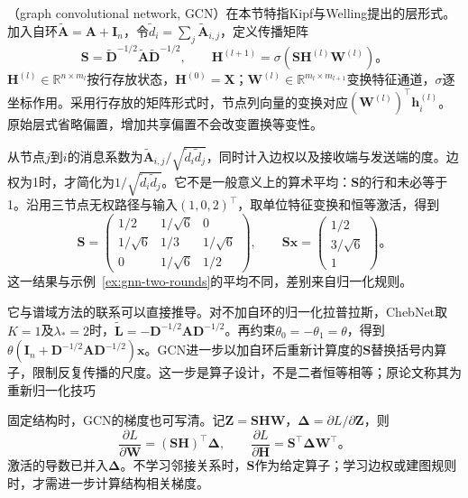 （graph convolutional network, GCN）在本节特指Kipf与Welling提出的层形式。加入自环$\widetilde{\bm{A}}=\bm{A}+\bm{I}_n$，令$\widetilde d_i=\sum_j\widetilde{\bm{A}}_{i,j}$，定义传播矩阵
\begin{equation}
  \bm{S}=\widetilde{\bm{D}}^{-1/2}\widetilde{\bm{A}}\widetilde{\bm{D}}^{-1/2},
  \qquad
  \bm{H}^{(l+1)}=\sigma\!\left(\bm{S}\bm{H}^{(l)}\bm{W}^{(l)}\right)\text{。}
  \label{eq:gnn-gcn-layer}
\end{equation}
$\bm{H}^{(l)}\in\mathbb{R}^{n\times m_l}$按行存放状态，$\bm{H}^{(0)}=\bm{X}$；$\bm{W}^{(l)}\in\mathbb{R}^{m_l\times m_{l+1}}$变换特征通道，$\sigma$逐坐标作用。采用行存放的矩阵形式时，节点列向量的变换对应$(\bm{W}^{(l)})^{\top}\bm{h}_i^{(l)}$。原始层式省略偏置，增加共享偏置不会改变置换等变性。

从节点$j$到$i$的消息系数为$\widetilde{\bm{A}}_{i,j}/\sqrt{\widetilde d_i\widetilde d_j}$，同时计入边权以及接收端与发送端的度。边权为1时，才简化为$1/\sqrt{\widetilde d_i\widetilde d_j}$。它不是一般意义上的算术平均：$\bm{S}$的行和未必等于1。沿用三节点无权路径与输入$(1,0,2)^{\top}$，取单位特征变换和恒等激活，得到
\begin{equation}
  \bm{S}=\begin{pmatrix}
    1/2&1/\sqrt6&0\\
    1/\sqrt6&1/3&1/\sqrt6\\
    0&1/\sqrt6&1/2
  \end{pmatrix},\qquad
  \bm{S}\bm{x}=\begin{pmatrix}1/2\\3/\sqrt6\\1\end{pmatrix}\text{。}
  \label{eq:gnn-gcn-example}
\end{equation}
这一结果与示例~\ref{ex:gnn-two-rounds}的平均不同，差别来自归一化规则。

它与谱域方法的联系可以直接推导。对不加自环的归一化拉普拉斯，ChebNet取$K=1$及$\lambda_*=2$时，$\widetilde{\bm{L}}=-\bm{D}^{-1/2}\bm{A}\bm{D}^{-1/2}$。再约束$\theta_0=-\theta_1=\theta$，得到$\theta(\bm{I}_n+\bm{D}^{-1/2}\bm{A}\bm{D}^{-1/2})\bm{x}$。GCN进一步以加自环后重新计算度的$\bm{S}$替换括号内算子，限制反复传播的尺度。这一步是算子设计，不是二者恒等相等；原论文称其为重新归一化技巧

固定结构时，GCN的梯度也可写清。记$\bm{Z}=\bm{S}\bm{H}\bm{W}$，$\bm{\Delta}=\partial L/\partial\bm{Z}$，则
\begin{equation}
  \frac{\partial L}{\partial\bm{W}}=(\bm{S}\bm{H})^{\top}\bm{\Delta},\qquad
  \frac{\partial L}{\partial\bm{H}}=\bm{S}^{\top}\bm{\Delta}\bm{W}^{\top}\text{。}
  \label{eq:gnn-gcn-backprop}
\end{equation}
激活的导数已并入$\bm{\Delta}$。不学习邻接关系时，$\bm{S}$作为给定算子；学习边权或建图规则时，才需进一步计算结构相关梯度。

